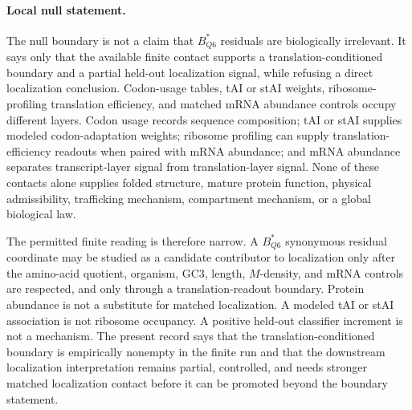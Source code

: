 \paragraph{Local null statement.}
The null boundary is not a claim that $B^{\ast}_{Q6}$ residuals are biologically irrelevant. It says only that the available finite contact supports a translation-conditioned boundary and a partial held-out localization signal, while refusing a direct localization conclusion. Codon-usage tables, tAI or stAI weights, ribosome-profiling translation efficiency, and matched mRNA abundance controls occupy different layers. Codon usage records sequence composition; tAI or stAI supplies modeled codon-adaptation weights; ribosome profiling can supply translation-efficiency readouts when paired with mRNA abundance; and mRNA abundance separates transcript-layer signal from translation-layer signal. None of these contacts alone supplies folded structure, mature protein function, physical admissibility, trafficking mechanism, compartment mechanism, or a global biological law.

The permitted finite reading is therefore narrow. A $B^{\ast}_{Q6}$ synonymous residual coordinate may be studied as a candidate contributor to localization only after the amino-acid quotient, organism, GC3, length, $M$-density, and mRNA controls are respected, and only through a translation-readout boundary. Protein abundance is not a substitute for matched localization. A modeled tAI or stAI association is not ribosome occupancy. A positive held-out classifier increment is not a mechanism. The present record says that the translation-conditioned boundary is empirically nonempty in the finite run and that the downstream localization interpretation remains partial, controlled, and needs stronger matched localization contact before it can be promoted beyond the boundary statement.
